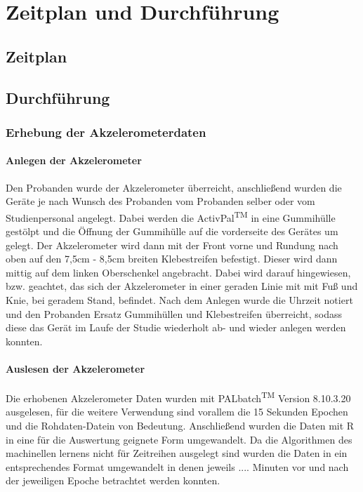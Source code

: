 \chapter{Zeitplan und Durchführung}

\section{Zeitplan}




\section{Durchführung}

\subsection{Erhebung der Akzelerometerdaten}

\subsubsection{Anlegen der Akzelerometer}
Den Probanden wurde der Akzelerometer überreicht, anschließend wurden die Geräte je nach Wunsch des Probanden vom Probanden selber oder vom Studienpersonal angelegt.
Dabei werden die ActivPal\textsuperscript{TM} in eine Gummihülle gestölpt und die Öffnung der Gummihülle auf die vorderseite des Gerätes um gelegt. Der Akzelerometer wird dann mit der Front vorne und Rundung nach oben auf den 7,5cm - 8,5cm breiten Klebestreifen befestigt. Dieser wird dann mittig auf dem linken Oberschenkel angebracht. Dabei wird darauf hingewiesen, bzw. geachtet, das sich der Akzelerometer in einer geraden Linie mit mit Fuß und Knie, bei geradem Stand, befindet. Nach dem Anlegen wurde die Uhrzeit notiert und den Probanden Ersatz Gummihüllen und Klebestreifen überreicht, sodass diese das Gerät im Laufe der Studie wiederholt ab- und wieder anlegen werden konnten.


\subsubsection{Auslesen der Akzelerometer}
Die erhobenen Akzelerometer Daten wurden mit PALbatch\textsuperscript{TM} Version 8.10.3.20 ausgelesen, für die weitere Verwendung sind vorallem die 15 Sekunden Epochen und die Rohdaten-Datein von Bedeutung. Anschließend wurden die Daten mit R in eine für die Auswertung geignete Form umgewandelt. Da die Algorithmen des machinellen lernens nicht für Zeitreihen ausgelegt sind wurden die Daten in ein entsprechendes Format umgewandelt in denen jeweils .... Minuten vor und nach der jeweiligen Epoche betrachtet werden konnten.


